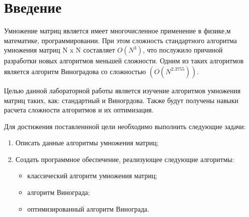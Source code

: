 \chapter*{Введение}

Умножение матриц является имеет многочисленное применение в физике,м
математике, программировании. При этом сложность стандартного алгоритма умножения матриц
N x N составляет $O(N^3)$, что послужило причиной разработки новых алгоритмов меньшей сложности. 
Одним из таких алгоритмов является алгоритм Виноградова со сложностью $(O(N^{2.3755}))$.

Целью данной лабораторной работы является изучение алгоритмов умножения матриц
таких, как: стандартный и Виногрдова. Также будут получены навыки расчета сложности алгоритмов 
и их оптимизация.

Для достижения поставленнной цели необходимо выполнить следующие задачи:

\begin{enumerate}[label={\arabic*)}]
	\item Описать данные алгоритмы умножения матриц;
	\item Создать программное обеспечение, реализующее следующие алгоритмы:
	\begin{itemize}[label=---]
		\item классический алгоритм умножения матриц;
		\item алгоритм Винограда;
		\item оптимизированный алгоритм Винограда.
	\end{itemize}
\end{enumerate}

